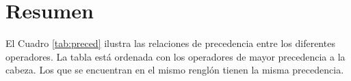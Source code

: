 \section{Resumen}

El Cuadro \ref{tab:preced} ilustra las relaciones de precedencia entre los diferentes operadores. La tabla está ordenada con los operadores de mayor precedencia a la cabeza. Los que se encuentran en el mismo renglón tienen la misma precedencia.

\begin{comment}
\tabla{preced}{Relaciones de precedencia entre operadores}{c|l|l}
{
\hline
Precedencia & Operador &\\
\hline
1 &\lstinline{()} & Llamada a función\\
  & \lstinline{[]} & Indexación de arreglo\\ 
 &\lstinline{-> .} & Acceso a miembros de estructuras\\
 \hline
2 &\lstinline{! ~} & Negación y complemento a uno\\
 &\lstinline{++ --}& Incremento y decremento\\
 &\lstinline{*} & Indirección \\
  &\lstinline{&} & Dirección de\\
 &\lstinline{()} & Conversión forzada de tipo (\textit{cast})\\
 &\lstinline{sizeof} & Tamaño de variables o tipos\\
 &\lstinline{+} unario &\\
  &\lstinline{-} unario &\\
 \hline
3 &\lstinline{* / \%}& Multiplicación, división y módulo\\
 \hline
4 &\lstinline{+ -} & Suma y resta\\
 \hline
5 &\lstinline{\<\< \>\>} & Desplazamiento de bits\\
 \hline
6 &\lstinline{\< \<= \>= \>} & Operadores de relación\\
 \hline
7 &\lstinline{== !=} & Operadores lógicos de igualdad \\
 \hline
8 &\lstinline{&} &AND de bits\\
 \hline
9 &\lstinline{^} &XOR de bits\\
 \hline
10 &\lstinline{|} &OR de bits\\
 \hline
11&\lstinline{&&}& AND lógico\\
 \hline
12&\lstinline{||}& OR lógico\\
 \hline
13&\lstinline{?:}& Operador ternario\\
&\lstinline{=} &Asignación\\
 \hline
14 &\lstinline{+= -= *= /= \%=}& Aritméticos y lógicos abreviados\\
&\lstinline{&= ^= |=} &\\
&\lstinline{\<\<= \>\>=} & \\
 \hline
15&\lstinline{,} & Operador coma\\
}
\end{comment}




